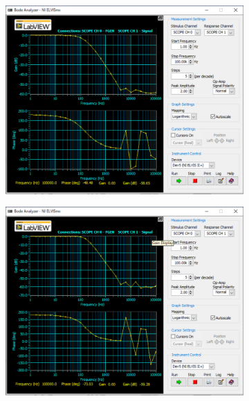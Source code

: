 \begin{figure}
	\centering
	\begin{subfigure}{0.8\linewidth}
		\addtocounter{subfigure}{2}
		\centering
		\includegraphics[width=0.8\linewidth]{src/figures/exp10/5k-band-bode.png}
		\label{fig:exp10-5k-band-bode}
	\end{subfigure}
	\begin{subfigure}{0.8\linewidth}
		\centering
		\includegraphics[width=0.8\linewidth]{src/figures/exp10/7k-band-bode.png}
		\label{fig:exp10-7k-band-bode}
	\end{subfigure}
\end{figure}
